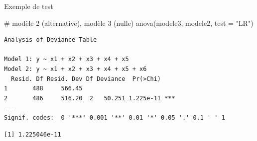 \documentclass[
  ignorenonframetext,
]{beamer}
\newenvironment{Shaded}{\begin{snugshade}}{\end{snugshade}}
\newcommand{\AttributeTok}[1]{\textcolor[rgb]{0.40,0.45,0.13}{#1}}
\newcommand{\CommentTok}[1]{\textcolor[rgb]{0.37,0.37,0.37}{#1}}
\newcommand{\ConstantTok}[1]{\textcolor[rgb]{0.56,0.35,0.01}{#1}}
\newcommand{\DecValTok}[1]{\textcolor[rgb]{0.68,0.00,0.00}{#1}}
\newcommand{\DocumentationTok}[1]{\textcolor[rgb]{0.37,0.37,0.37}{\textit{#1}}}
\newcommand{\FunctionTok}[1]{\textcolor[rgb]{0.28,0.35,0.67}{#1}}
\newcommand{\NormalTok}[1]{\textcolor[rgb]{0.00,0.23,0.31}{#1}}
\newcommand{\OtherTok}[1]{\textcolor[rgb]{0.00,0.23,0.31}{#1}}
\newcommand{\SpecialCharTok}[1]{\textcolor[rgb]{0.37,0.37,0.37}{#1}}
\newcommand{\StringTok}[1]{\textcolor[rgb]{0.13,0.47,0.30}{#1}}
\begin{document}
\begin{frame}[fragile]{Exemple de test}
\protect\hypertarget{exemple-de-test}{}
\footnotesize

\begin{Shaded}
\begin{Highlighting}[numbers=left,,]
\CommentTok{\# modèle 2 (alternative), modèle 3 (nulle)}
\FunctionTok{anova}\NormalTok{(modele3, modele2, }\AttributeTok{test =} \StringTok{"LR"}\NormalTok{)}
\end{Highlighting}
\end{Shaded}

\begin{verbatim}
Analysis of Deviance Table

Model 1: y ~ x1 + x2 + x3 + x4 + x5
Model 2: y ~ x1 + x2 + x3 + x4 + x5 + x6
  Resid. Df Resid. Dev Df Deviance  Pr(>Chi)    
1       488     566.45                          
2       486     516.20  2   50.251 1.225e-11 ***
---
Signif. codes:  0 '***' 0.001 '**' 0.01 '*' 0.05 '.' 0.1 ' ' 1
\end{verbatim}

\begin{Shaded}
\end{Shaded}

\begin{verbatim}
[1] 1.225046e-11
\end{verbatim}

\normalsize
\end{frame}
\end{document}
